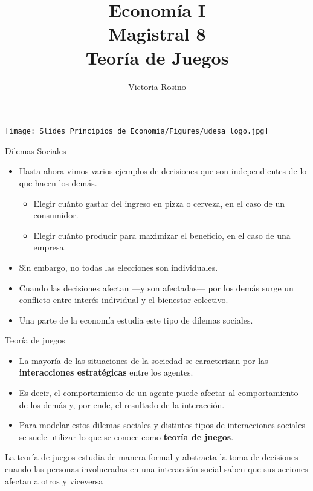 \documentclass{beamer}
\title[Economía I]{Economía I \vspace{3mm}
\\ Magistral 8 \vspace{3mm} \\ Teoría de Juegos}
\date{}
\author[Victoria Rosino]{Victoria Rosino}
\institute[]{Universidad de San Andrés}
\begin{document}
\begin{frame}
\vspace{0.3cm}
\titlepage
\centering
\vspace{-0.9cm}
\texttt{[image: Slides Principios de Economia/Figures/udesa\_logo.jpg]} 
\end{frame}

\begin{frame}{Dilemas Sociales}
    \begin{itemize}
    \item  Hasta ahora vimos varios ejemplos de decisiones que son independientes de lo que hacen los demás. \vspace{1mm}
    \begin{itemize}
    \item Elegir cuánto gastar del ingreso en pizza o cerveza, en el caso de un consumidor.
    \item  Elegir cuánto producir para maximizar el beneficio, en el caso de una empresa. \vspace{1mm}
    \end{itemize}
     \item Sin embargo, no todas las elecciones son individuales. \vspace{1mm}
     \item Cuando las decisiones afectan —y son afectadas— por los demás surge un conflicto entre interés individual y el bienestar colectivo. \vspace{1mm}
    \item Una parte de la economía estudia este tipo de dilemas sociales. 
    \end{itemize}
\end{frame}


\begin{frame}{Teoría de juegos}
    \begin{itemize}
    \item  La mayoría de las situaciones de la sociedad se caracterizan por las \textbf{interacciones estratégicas} entre los agentes. \vspace{1mm}
     \item Es decir, el comportamiento de un agente puede afectar al comportamiento de los demás y, por ende, el resultado de la interacción. \vspace{1mm}
    \item Para modelar estos dilemas sociales y distintos tipos de interacciones sociales se suele utilizar lo que se conoce como \textbf{teoría de juegos}. \vspace{2mm}
    \end{itemize}
    \begin{boxB}
    \centering
    La teoría de juegos estudia de manera formal y abstracta la toma de decisiones cuando las personas involucradas en una interacción social saben que sus acciones afectan a otros y viceversa
    \end{boxB}
\end{frame}
\end{document}
